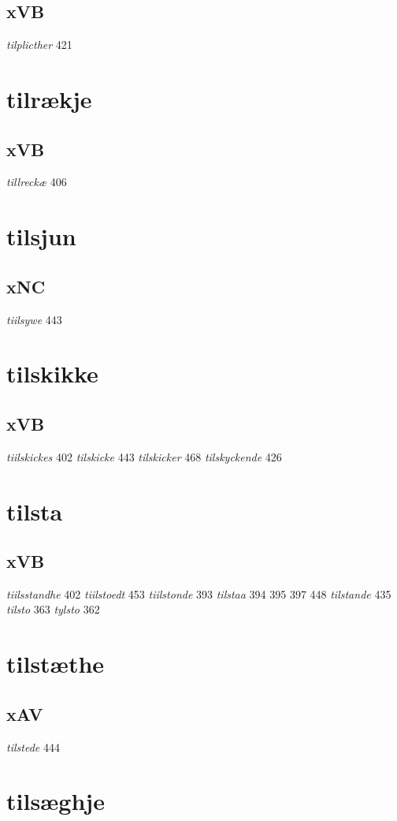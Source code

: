 \documentclass[a4paper,twocolumn]{article}
\begin{document}
\subsection{xVB}
\label{sec:org93274e7}
\emph{tilplicther} 421 
\section{tilrækje}
\label{sec:org7edb653}
\subsection{xVB}
\label{sec:orgcb21925}
\emph{tillreckæ} 406 
\section{tilsjun}
\label{sec:org90a5195}
\subsection{xNC}
\label{sec:org97a1377}
\emph{tiilsywe} 443 
\section{tilskikke}
\label{sec:org14a0d93}
\subsection{xVB}
\label{sec:org44ec33e}
\emph{tiilskickes} 402 \emph{tilskicke} 443 \emph{tilskicker} 468 \emph{tilskyckende} 426 
\section{tilsta}
\label{sec:orga5d5d43}
\subsection{xVB}
\label{sec:org491642a}
\emph{tiilsstandhe} 402 \emph{tiilstoedt} 453 \emph{tiilstonde} 393 \emph{tilstaa} 394 395 397 448 \emph{tilstande} 435 \emph{tilsto} 363 \emph{tylsto} 362 
\section{tilstæthe}
\label{sec:org1c8b101}
\subsection{xAV}
\label{sec:org8e7db93}
\emph{tilstede} 444 
\section{tilsæghje}
\label{sec:orgae0b535}
\end{document}
